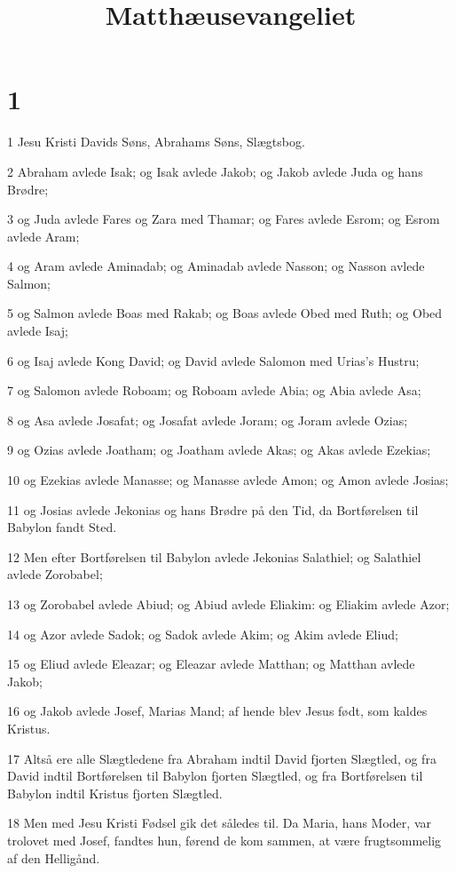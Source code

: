 

\title{Matthæusevangeliet}


\chapter{1}

\par 1 Jesu Kristi Davids Søns, Abrahams Søns, Slægtsbog.
\par 2 Abraham avlede Isak; og Isak avlede Jakob; og Jakob avlede Juda og hans Brødre;
\par 3 og Juda avlede Fares og Zara med Thamar; og Fares avlede Esrom; og Esrom avlede Aram;
\par 4 og Aram avlede Aminadab; og Aminadab avlede Nasson; og Nasson avlede Salmon;
\par 5 og Salmon avlede Boas med Rakab; og Boas avlede Obed med Ruth; og Obed avlede Isaj;
\par 6 og Isaj avlede Kong David; og David avlede Salomon med Urias's Hustru;
\par 7 og Salomon avlede Roboam; og Roboam avlede Abia; og Abia avlede Asa;
\par 8 og Asa avlede Josafat; og Josafat avlede Joram; og Joram avlede Ozias;
\par 9 og Ozias avlede Joatham; og Joatham avlede Akas; og Akas avlede Ezekias;
\par 10 og Ezekias avlede Manasse; og Manasse avlede Amon; og Amon avlede Josias;
\par 11 og Josias avlede Jekonias og hans Brødre på den Tid, da Bortførelsen til Babylon fandt Sted.
\par 12 Men efter Bortførelsen til Babylon avlede Jekonias Salathiel; og Salathiel avlede Zorobabel;
\par 13 og Zorobabel avlede Abiud; og Abiud avlede Eliakim: og Eliakim avlede Azor;
\par 14 og Azor avlede Sadok; og Sadok avlede Akim; og Akim avlede Eliud;
\par 15 og Eliud avlede Eleazar; og Eleazar avlede Matthan; og Matthan avlede Jakob;
\par 16 og Jakob avlede Josef, Marias Mand; af hende blev Jesus født, som kaldes Kristus.
\par 17 Altså ere alle Slægtledene fra Abraham indtil David fjorten Slægtled, og fra David indtil Bortførelsen til Babylon fjorten Slægtled, og fra Bortførelsen til Babylon indtil Kristus fjorten Slægtled.
\par 18 Men med Jesu Kristi Fødsel gik det således til. Da Maria, hans Moder, var trolovet med Josef, fandtes hun, førend de kom sammen, at være frugtsommelig af den Helligånd.
